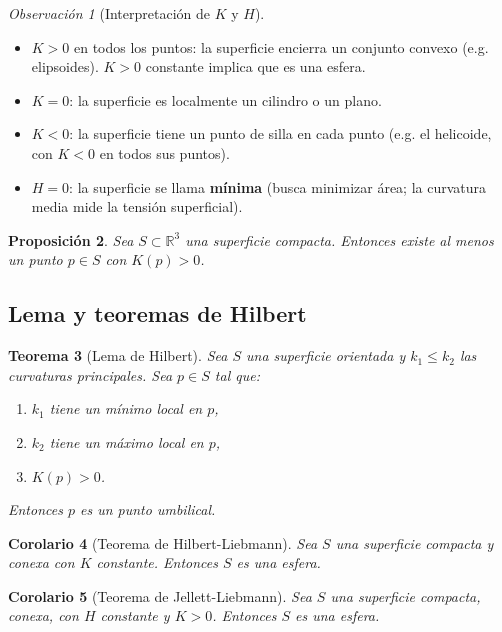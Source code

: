 \documentclass[11pt]{article}
\theoremstyle{plain}
\newtheorem{teorema}{Teorema}[section]
\newtheorem{proposicion}[teorema]{Proposición}
\newtheorem{corolario}[teorema]{Corolario}
\theoremstyle{definition}
\theoremstyle{remark}
\newtheorem{observacion}[teorema]{Observación}
\begin{document}
\begin{observacion}[Interpretación de $K$ y $H$]\
\begin{itemize}
\item $K>0$ en todos los puntos: la superficie encierra un conjunto convexo (e.g. elipsoides). $K>0$ constante implica que es una esfera.
\item $K=0$: la superficie es localmente un cilindro o un plano.
\item $K<0$: la superficie tiene un punto de silla en cada punto (e.g. el helicoide, con $K<0$ en todos sus puntos).
\item $H=0$: la superficie se llama \textbf{mínima} (busca minimizar área; la curvatura media mide la tensión superficial).
\end{itemize}
\end{observacion}

\begin{proposicion}
Sea $S\subset\mathbb{R}^3$ una superficie compacta. Entonces existe al menos un punto $p\in S$ con $K(p)>0$.
\end{proposicion}

\subsection{Lema y teoremas de Hilbert}

\begin{teorema}[Lema de Hilbert]
Sea $S$ una superficie orientada y $k_1\leq k_2$ las curvaturas principales. Sea $p\in S$ tal que:
\begin{enumerate}
\item $k_1$ tiene un mínimo local en $p$,
\item $k_2$ tiene un máximo local en $p$,
\item $K(p)>0$.
\end{enumerate}
Entonces $p$ es un punto umbilical.
\end{teorema}

\begin{corolario}[Teorema de Hilbert-Liebmann]
Sea $S$ una superficie compacta y conexa con $K$ constante. Entonces $S$ es una esfera.
\end{corolario}

\begin{corolario}[Teorema de Jellett-Liebmann]
Sea $S$ una superficie compacta, conexa, con $H$ constante y $K>0$. Entonces $S$ es una esfera.
\end{corolario}
\end{document}
